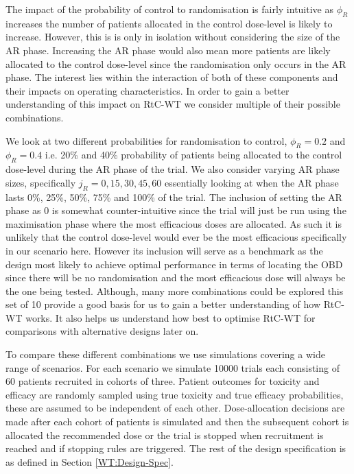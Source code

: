  The impact of the probability of control to randomisation is fairly intuitive as $\phi_R$ increases the number of patients allocated in the control dose-level is likely to increase. However, this is is only in isolation without considering the size of the AR phase. Increasing the AR phase would also mean more patients are likely allocated to the control dose-level since the randomisation only occurs in the AR phase. The interest lies within the interaction of both of these components and their impacts on operating characteristics. In order to gain a better understanding of this impact on RtC-WT we consider multiple of their possible combinations. 
 
 We look at two different probabilities for randomisation to control, $\phi_R = 0.2$ and $\phi_R = 0.4$ i.e. 20\% and 40\% probability of patients being allocated to the control dose-level during the AR phase of the trial. We also consider varying AR phase sizes, specifically $j_R = 0, 15, 30, 45 ,60$ essentially looking at when the AR phase lasts 0\%, 25\%, 50\%, 75\% and 100\% of the trial. The inclusion of setting the AR phase as 0 is somewhat counter-intuitive since the trial will just be run using the maximisation phase where the most efficacious doses are allocated. As such it is unlikely that the control dose-level would ever be the most efficacious specifically in our scenario here. However its inclusion will serve as a benchmark as the design most likely to achieve optimal performance in terms of locating the OBD since there will be no randomisation and the most efficacious dose will always be the one being tested. Although, many more combinations could be explored this set of 10 provide a good basis for us to gain a better understanding of how RtC-WT works. It also helps us understand how best to optimise RtC-WT for comparisons with alternative designs later on.  
 
 To compare these different combinations we use simulations covering a wide range of scenarios. For each scenario we simulate 10000 trials each consisting of 60 patients recruited in cohorts of three. Patient outcomes for toxicity and efficacy are randomly sampled using true toxicity and true efficacy probabilities, these are assumed to be independent of each other. Dose-allocation decisions are made after each cohort of patients is simulated and then the subsequent cohort is allocated the recommended dose or the trial is stopped when recruitment is reached and if stopping rules are triggered. The rest of the design specification is as defined in Section \ref{WT:Design-Spec}. 
 
